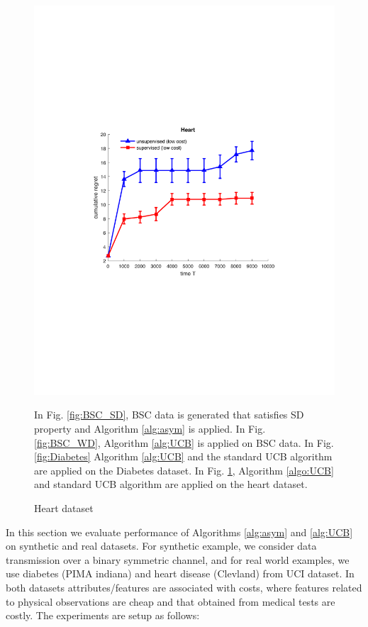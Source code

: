 \begin{figure}[!bt]
\begin{minipage}{4cm}
		\includegraphics[scale=0.3]{../Simulations/Figures/Heart_WD1}
		\label{fig:Heart}
		\vspace{-1cm}
		\caption{Heart dataset}
	\end{minipage}
	\vspace{.2cm}

\noindent
In Fig. \ref{fig:BSC_SD}, BSC data is generated that satisfies SD property and Algorithm \ref{alg:asym} is applied. In  Fig. \ref{fig:BSC_WD}, Algorithm \ref{alg:UCB} is applied on BSC data. In Fig. \ref{fig:Diabetes} Algorithm \ref{alg:UCB} and the standard UCB algorithm are applied on the Diabetes dataset. In Fig. \ref{fig:Heart}, Algorithm \ref{algo:UCB} and standard UCB algorithm are applied on the heart dataset. 
\end{figure}

In this section we evaluate performance of Algorithms \ref{alg:asym} and \ref{alg:UCB} on synthetic and real datasets. For synthetic example, we consider data transmission over a binary symmetric channel, and for real world examples, we use diabetes (PIMA indiana) and heart disease (Clevland) from UCI dataset. In both datasets attributes/features are associated with costs, where features related to physical observations are cheap and that obtained from medical tests are costly. The experiments are setup as follows:

